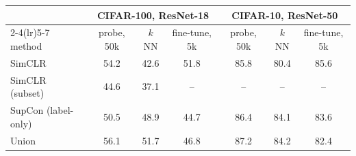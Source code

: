 \begin{tabular}{l ccc ccc}
\toprule
 & \multicolumn{3}{c}{CIFAR-100, ResNet-18} & \multicolumn{3}{c}{CIFAR-10, ResNet-50} \\
\cmidrule(lr){2-4}\cmidrule(lr){5-7}
method & probe, 50k & $k$NN & fine-tune, 5k & probe, 50k & $k$NN & fine-tune, 5k \\
\midrule
SimCLR & 54.2 & 42.6 & 51.8 & 85.8 & 80.4 & 85.6 \\
SimCLR (subset) & 44.6 & 37.1 & -- & -- & -- & -- \\
SupCon (label-only) & 50.5 & 48.9 & 44.7 & 86.4 & 84.1 & 83.6 \\
Union & 56.1 & 51.7 & 46.8 & 87.2 & 84.2 & 82.4 \\
\bottomrule
\end{tabular}
